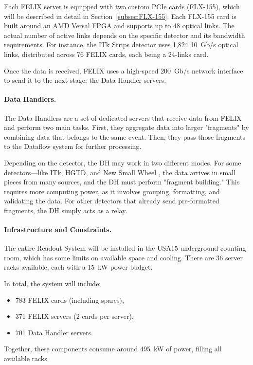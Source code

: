 Each \acs{FELIX} server is equipped with two custom \acs{PCIe} cards (FLX-155), which will be described in detail in Section~\ref{subsec:FLX-155}. Each FLX-155 card is built around an AMD Versal \acs{FPGA} and supports up to 48 optical links. The actual number of active links depends on the specific detector and its bandwidth requirements. For instance, the \acs{ITk} Strips detector uses 1,824 10~Gb/s optical links, distributed across 76 FELIX cards, each being a 24-links card.

Once the data is received, \acs{FELIX} uses a high-speed 200~Gb/s network interface to send it to the next stage: the Data Handler servers.

\paragraph{Data Handlers.}
The Data Handlers are a set of dedicated servers that receive data from \acs{FELIX} and perform two main tasks. First, they aggregate data into larger "fragments" by combining data that belongs to the same event. Then, they pass those fragments to the Dataflow system for further processing.

Depending on the detector, the \acs{DH} may work in two different modes. For some detectors—like \acs{ITk}, \acs{HGTD}, and New Small Wheel \cite{nsw}, the data arrives in small pieces from many sources, and the \acs{DH} must perform "fragment building." This requires more computing power, as it involves grouping, formatting, and validating the data. For other detectors that already send pre-formatted fragments, the \acs{DH} simply acts as a relay.

\paragraph{Infrastructure and Constraints.}
The entire Readout System will be installed in the USA15 underground counting room, which has some limits on available space and cooling. There are 36 server racks available, each with a 15~kW power budget.

In total, the system will include:
\begin{itemize}
    \item 783 \acs{FELIX} cards (including spares),
    \item 371 \acs{FELIX} servers (2 cards per server),
    \item 701 Data Handler servers.
\end{itemize}

Together, these components consume around 495~kW of power, filling all available racks.


